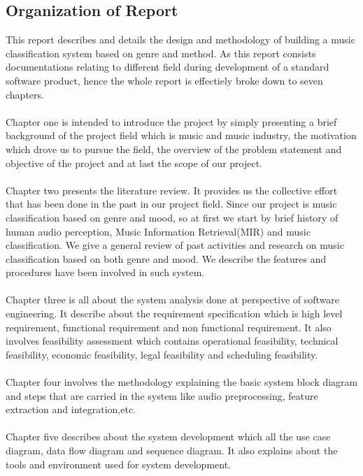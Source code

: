 \subsection{Organization of Report}
This report describes and details the design and methodology of building a music classification system based on genre and method. As this report consists
documentations relating to different field during development of a standard software product, hence the whole report is effectiely broke down to seven chapters.\\
\\
Chapter one is intended to introduce the project by simply presenting a brief background of the project field which is music and music industry, the motivation which drove 
us to pursue the field, the overview of the problem statement and objective of the project and at last the scope of our project.\\
\\
Chapter two presents the literature review. It provides us the collective effort that has been done in the past in our project field. Since our
project is music classification based on genre and mood, so at first we start by brief history of human audio perception, Music Information Retrieval(MIR) and music classification.
We give a general review of past activities and research on music classification based on both genre and mood. We describe the features and procedures have been involved in such system.\\
\\
Chapter three is all about the system analysis done at perspective of software engineering. It describe about the requirement specification which is
high level requirement, functional requirement and non functional requirement. It also involves feasibility assessment which contains operational feasibility, 
technical feasibility, economic feasibility, legal feasibility and scheduling feasibility.\\
\\
Chapter four involves the methodology explaining the basic system block diagram and steps that are carried in the system like audio preprocessing, feature extraction and integration,etc.\\
\\
Chapter five describes about the system development which all the use case diagram, data flow diagram and sequence diagram. It also explains about the tools and environment used for system development.\\
\\
